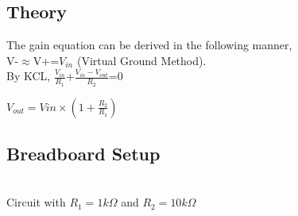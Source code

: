 \documentclass{article}
\begin{document}
\subsection{Theory}
\begin{figure}
\end{figure}
The gain equation can be derived in the following manner, \\ V-$\approx$V+=$V_{in}$ (Virtual Ground Method). \\

\noindent
By KCL, $\frac{V_{in}}{R_{1}}$+$\frac{V_{in}-V_{out}}{R_{2}}$=0 \\

\begin{center}
    \textbf{$V_{out}=V{in}\times(1+\frac{R_{2}}{R_{1}})$}
\end{center}

\subsection{Breadboard Setup}
\vspace{5px}
\begin{center}
 \\ \vspace{5px}
Circuit with $R_{1}=1k\Omega$ and $R_{2}=10k\Omega$\\
\end{center}

\newpage
\end{document}
